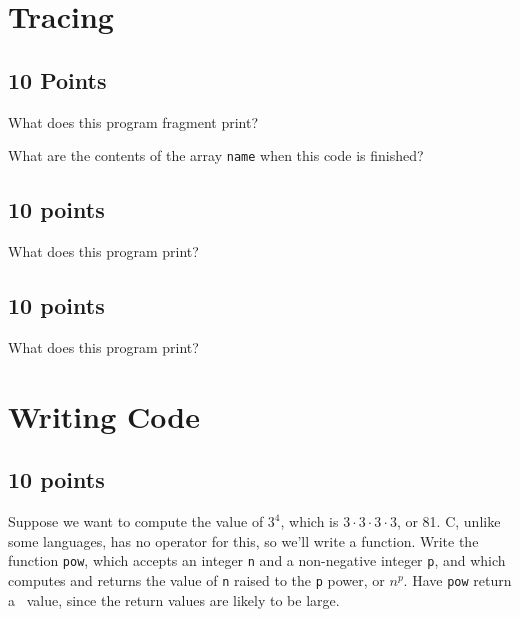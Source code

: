 \section{Tracing}

\subsection{10 Points}

What does this program fragment print?

What are the contents of the array {\tt name} when this code is finished?

\subsection{10 points}

What does this program print?


\subsection{10 points}

What does this program print?


\section{Writing Code}

\subsection{10 points}

Suppose we want to compute the value of $3^4$, which is $3\cdot 3\cdot
3\cdot 3$, or 81.  C, unlike some languages, has no operator for this,
so we'll write a function.  Write the function {\tt pow}, which accepts
an integer {\tt n} and a non-negative integer {\tt p}, and which
computes and returns the value of {\tt n} raised to the {\tt p} power,
or $n^p$.  Have {\tt pow} return a \longint\ value, since the return
values are likely to be large.

